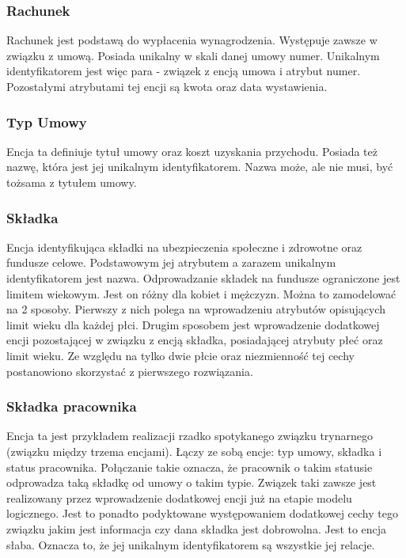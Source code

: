 \subsubsection{Rachunek}
Rachunek jest podstawą do wypłacenia wynagrodzenia. Występuje zawsze w związku z umową. Posiada unikalny w skali danej umowy numer. Unikalnym identyfikatorem jest więc para - związek z encją umowa i atrybut numer. Pozostałymi atrybutami tej encji są kwota oraz data wystawienia.

\subsubsection{Typ Umowy}
Encja ta definiuje tytuł umowy oraz koszt uzyskania przychodu. Posiada też nazwę, która jest jej unikalnym identyfikatorem. Nazwa może, ale nie musi, być tożsama z tytułem umowy.

\subsubsection{Składka}
Encja identyfikująca składki na ubezpieczenia społeczne i zdrowotne oraz fundusze celowe. Podstawowym jej atrybutem a zarazem unikalnym identyfikatorem jest nazwa. Odprowadzanie składek na fundusze ograniczone jest limitem wiekowym. Jest on różny dla kobiet i mężczyzn. Można to zamodelować na 2 sposoby. Pierwszy z nich polega na wprowadzeniu atrybutów opisujących limit wieku dla każdej płci. Drugim sposobem jest wprowadzenie dodatkowej encji pozostającej w związku z encją składka, posiadającej atrybuty płeć oraz limit wieku. Ze względu na tylko dwie płcie oraz niezmienność tej cechy postanowiono skorzystać z pierwszego rozwiązania.

\subsubsection{Składka pracownika}
Encja ta jest przykładem realizacji rzadko spotykanego związku trynarnego (związku między trzema encjami).  Łączy ze sobą encje: typ umowy, składka i status pracownika. Połączanie takie oznacza, że pracownik o takim statusie odprowadza taką składkę od umowy o takim typie. Związek taki zawsze jest realizowany przez wprowadzenie dodatkowej encji już na etapie modelu logicznego.  Jest to ponadto podyktowane występowaniem dodatkowej cechy tego związku jakim jest informacja czy dana składka jest dobrowolna. Jest to encja słaba. Oznacza to, że jej unikalnym identyfikatorem są wszystkie jej relacje.


